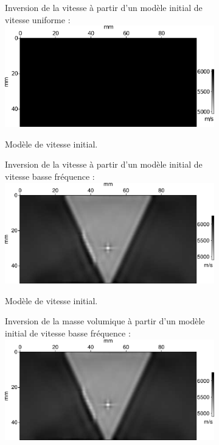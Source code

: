 	\begin{figure}[p]
	\begin{changemargin}{-2cm}{-2cm}
		\centering
		\begin{subfigure}[b]{0.29\textwidth}
			\centering
			Inversion de la vitesse à partir d'un modèle initial de vitesse uniforme : \\[0.2cm]
			\includegraphics[width=\textwidth]{img/mono_param/vp_uni.png}
			\caption{Modèle de vitesse initial.}
		\end{subfigure}
		\begin{subfigure}[b]{0.29\textwidth}
			\centering
			Inversion de la vitesse à partir d'un modèle initial de vitesse basse fréquence : \\[0.2cm] 
			\includegraphics[width=\textwidth]{img/mono_param/vp_smooth.png}
			\caption{Modèle de vitesse initial.}
		\end{subfigure}
		\begin{subfigure}[b]{0.29\textwidth}
			\centering
			Inversion de la masse volumique à partir d'un modèle initial de vitesse basse fréquence :  \\[0.2cm]
			\includegraphics[width=\textwidth]{img/mono_param/vp_smooth.png}

\end{subfigure}
\end{changemargin}
\end{figure}
